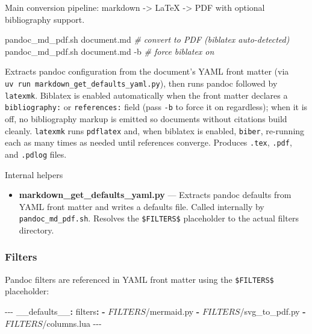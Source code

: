 \documentclass[
]{article}
\newenvironment{Shaded}{}{}
\newcommand{\AttributeTok}[1]{\textcolor[rgb]{0.49,0.56,0.16}{#1}}
\newcommand{\CommentTok}[1]{\textcolor[rgb]{0.38,0.63,0.69}{\textit{#1}}}
\newcommand{\ExtensionTok}[1]{#1}
\newcommand{\FunctionTok}[1]{\textcolor[rgb]{0.02,0.16,0.49}{#1}}
\newcommand{\KeywordTok}[1]{\textcolor[rgb]{0.00,0.44,0.13}{\textbf{#1}}}
\newcommand{\NormalTok}[1]{#1}
\newcommand{\PreprocessorTok}[1]{\textcolor[rgb]{0.74,0.48,0.00}{#1}}
\providecommand{\tightlist}{%
  \setlength{\itemsep}{0pt}\setlength{\parskip}{0pt}}
\begin{document}
Main conversion pipeline: markdown -\textgreater{} LaTeX -\textgreater{}
PDF with optional bibliography support.

\begin{Shaded}
\begin{Highlighting}[]
\ExtensionTok{pandoc\_md\_pdf.sh}\NormalTok{ document.md       }\CommentTok{\# convert to PDF (biblatex auto{-}detected)}
\ExtensionTok{pandoc\_md\_pdf.sh}\NormalTok{ document.md }\AttributeTok{{-}b}    \CommentTok{\# force biblatex on}
\end{Highlighting}
\end{Shaded}

Extracts pandoc configuration from the document's YAML front matter (via
\texttt{uv\ run\ markdown\_get\_defaults\_yaml.py}), then runs pandoc
followed by \texttt{latexmk}. Biblatex is enabled automatically when the
front matter declares a \texttt{bibliography:} or \texttt{references:}
field (pass \texttt{-b} to force it on regardless); when it is off, no
bibliography markup is emitted so documents without citations build
cleanly. \texttt{latexmk} runs \texttt{pdflatex} and, when biblatex is
enabled, \texttt{biber}, re-running each as many times as needed until
references converge. Produces \texttt{.tex}, \texttt{.pdf}, and
\texttt{.pdlog} files.

Internal helpers

\begin{itemize}
\tightlist
\item
  \textbf{markdown\_get\_defaults\_yaml.py} --- Extracts pandoc defaults
  from YAML front matter and writes a defaults file. Called internally
  by \texttt{pandoc\_md\_pdf.sh}. Resolves the \texttt{\$FILTERS\$}
  placeholder to the actual filters directory.
\end{itemize}

\subsubsection{Filters}\label{filters}

Pandoc filters are referenced in YAML front matter using the
\texttt{\$FILTERS\$} placeholder:

\begin{Shaded}
\begin{Highlighting}[]
\PreprocessorTok{{-}{-}{-}}
\FunctionTok{\_\_defaults\_\_}\KeywordTok{:}
\AttributeTok{  }\FunctionTok{filters}\KeywordTok{:}
\AttributeTok{    }\KeywordTok{{-}}\AttributeTok{ $FILTERS$/mermaid.py}
\AttributeTok{    }\KeywordTok{{-}}\AttributeTok{ $FILTERS$/svg\_to\_pdf.py}
\AttributeTok{    }\KeywordTok{{-}}\AttributeTok{ $FILTERS$/columns.lua}
\PreprocessorTok{{-}{-}{-}}
\end{Highlighting}
\end{Shaded}
\end{document}
